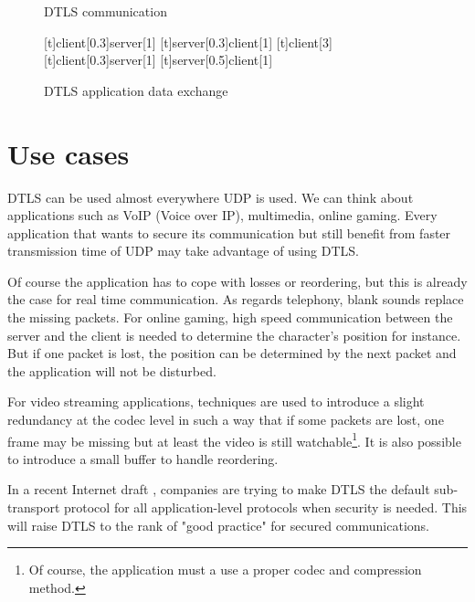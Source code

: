 \begin{figure}[!h]
\centering
\begin{msc}[r]{DTLS communication}

\setlength{\instfootheight}{0em}
\setlength{\instheadheight}{0em}
\setlength{\instdist}{0.7\linewidth}
\setlength{\levelheight}{3em}


[t]{client}[0.3]{server}[1]
\nextlevel
{}[t]{server}[0.3]{client}[1]
\nextlevel
\nextlevel
{}[t]{}{client}[3]
\nextlevel
{}[t]{client}[0.3]{server}[1]
\nextlevel
{}[t]{server}[0.5]{client}[1]
\nextlevel
\nextlevel
\end{msc}
\caption{DTLS application data exchange}
\label{fig:dtls-data}
\end{figure}

\section{Use cases}

\label{sec:dtls-usage}

DTLS can be used almost everywhere UDP is used. We can think about applications such as VoIP (Voice over IP), multimedia, online gaming. Every application that wants to secure its communication but still benefit from faster transmission time of UDP may take advantage of using DTLS.

Of course the application has to cope with losses or reordering, but this is already the case for real time communication. As regards telephony, blank sounds replace the missing packets. For online gaming, high speed communication between the server and the client is needed to determine the character's position for instance. But if one packet is lost, the position can be determined by the next packet and the application will not be disturbed.

For video streaming applications, techniques are used to introduce a slight redundancy at the codec level in such a way that if some packets are lost, one frame may be missing but at least the video is still watchable\footnote{Of course, the application must a use a proper codec and compression method.}. It is also possible to introduce a small buffer to handle reordering.

In a recent Internet draft \cite{dtls-as-subtransport}, companies are trying to make DTLS the default sub-transport protocol for all application-level protocols when security is needed. This will raise DTLS to the rank of "good practice" for secured communications.

